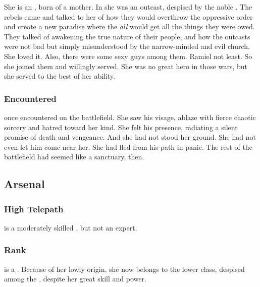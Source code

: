 She is an \quo{\ashenblood}, born of a \nephilic{} mother. 
In \Merkyrah{} she was an outcast, despised by the noble \resphain. 
The rebels came and talked to her of how they would overthrow the oppressive order and create a new paradise where the \resphain\dash \emph{all} \resphain\dash would get all the things they were owed. 
They talked of awakening the true nature of their people, and how the outcasts were not bad but simply misunderstood by the narrow-minded and evil church. 
She loved it. 
Also, there were some sexy guys among them. 
Ramiel not least. 
So she joined them and willingly served. 
She was no great hero in those wars, but she served to the best of her ability. 





\subsubsection{Encountered \Ishnaruchaefir}
\Achsah once encountered \Ishnaruchaefir on the battlefield. 
She saw his visage, ablaze with fierce chaotic sorcery and hatred toward her kind. 
She felt his presence, radiating a silent promise of death and vengeance. 
And she had not stood her ground. 
She had not even let him come near her. 
She had fled from his path in panic. 
The rest of the battlefield had seemed like a sanctuary, then. 










\subsection{Arsenal}





\subsubsection{High Telepath}
\Achsah{} is a moderately skilled , but not an expert. 





\subsubsection{Rank}
\Achsah{} is a \bezed{}. 
Because of her lowly origin, she now belongs to the lower class, despised among the \resphain, despite her great skill and power. 

